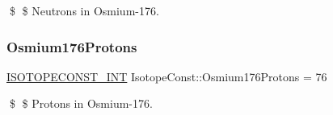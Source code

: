 \$ \$ Neutrons in Osmium-\/176. \mbox{\label{group___isotope_const-_osmium-_os176_gab64914ffe59eacda1f0f9074119bf5c5}} 
\subsubsection{\texorpdfstring{Osmium176\+Protons}{Osmium176Protons}}
{\footnotesize\ttfamily \mbox{\hyperlink{group___isotope_const-_macros_ga5f18360b3e99483a35c32d789e62621c}{I\+S\+O\+T\+O\+P\+E\+C\+O\+N\+S\+T\+\_\+\+I\+NT}} Isotope\+Const\+::\+Osmium176\+Protons = 76}

\$ \$ Protons in Osmium-\/176. 